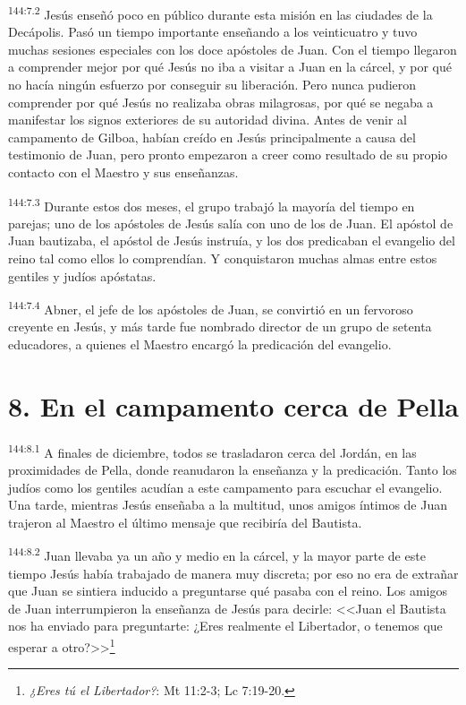 \par 
\textsuperscript{144:7.2} Jesús enseñó poco en público durante esta misión en las ciudades de la Decápolis. Pasó un tiempo importante enseñando a los veinticuatro y tuvo muchas sesiones especiales con los doce apóstoles de Juan. Con el tiempo llegaron a comprender mejor por qué Jesús no iba a visitar a Juan en la cárcel, y por qué no hacía ningún esfuerzo por conseguir su liberación. Pero nunca pudieron comprender por qué Jesús no realizaba obras milagrosas, por qué se negaba a manifestar los signos exteriores de su autoridad divina. Antes de venir al campamento de Gilboa, habían creído en Jesús principalmente a causa del testimonio de Juan, pero pronto empezaron a creer como resultado de su propio contacto con el Maestro y sus enseñanzas.

\par 
\textsuperscript{144:7.3} Durante estos dos meses, el grupo trabajó la mayoría del tiempo en parejas; uno de los apóstoles de Jesús salía con uno de los de Juan. El apóstol de Juan bautizaba, el apóstol de Jesús instruía, y los dos predicaban el evangelio del reino tal como ellos lo comprendían. Y conquistaron muchas almas entre estos gentiles y judíos apóstatas.

\par 
\textsuperscript{144:7.4} Abner, el jefe de los apóstoles de Juan, se convirtió en un fervoroso creyente en Jesús, y más tarde fue nombrado director de un grupo de setenta educadores, a quienes el Maestro encargó la predicación del evangelio.

\section*{8. En el campamento cerca de Pella}
\par 
\textsuperscript{144:8.1} A finales de diciembre, todos se trasladaron cerca del Jordán, en las proximidades de Pella, donde reanudaron la enseñanza y la predicación. Tanto los judíos como los gentiles acudían a este campamento para escuchar el evangelio. Una tarde, mientras Jesús enseñaba a la multitud, unos amigos íntimos de Juan trajeron al Maestro el último mensaje que recibiría del Bautista.

\par 
\textsuperscript{144:8.2} Juan llevaba ya un año y medio en la cárcel, y la mayor parte de este tiempo Jesús había trabajado de manera muy discreta; por eso no era de extrañar que Juan se sintiera inducido a preguntarse qué pasaba con el reino. Los amigos de Juan interrumpieron la enseñanza de Jesús para decirle: <<Juan el Bautista nos ha enviado para preguntarte: ¿Eres realmente el Libertador, o tenemos que esperar a otro?>>\footnote{\textit{¿Eres tú el Libertador?}: Mt 11:2-3; Lc 7:19-20.}

